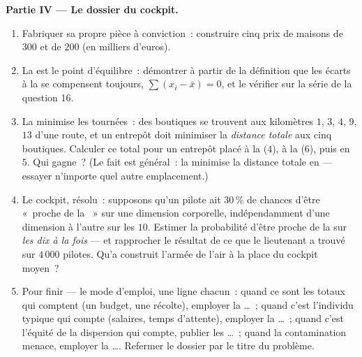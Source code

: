 \begin{problem}
\medskip
\noindent\textbf{Partie IV --- Le dossier du cockpit.}
\begin{enumerate}[resume]
  \item Fabriquer sa propre pièce à conviction~: construire cinq
        prix de maisons de  $300$ et de  $200$ (en
        milliers d'euros).
  \item La  est le point d'équilibre~: démontrer à partir de
        la définition que les écarts à la  se compensent
        toujours, $\sum (x_i - \bar x) = 0$, et le vérifier sur la
        série de la question 16.
  \item La  minimise les tournées~: des boutiques se
        trouvent aux kilomètres $1$, $3$, $4$, $9$, $13$ d'une
        route, et un entrepôt doit minimiser la \emph{distance
        totale} aux cinq boutiques. Calculer ce total pour un
        entrepôt placé à la  ($4$), à la  ($6$), puis
        en $5$. Qui gagne~? (Le fait est général~: la 
        minimise la distance totale en  --- essayer
        n'importe quel autre emplacement.)
  \item Le cockpit, résolu~: supposons qu'un pilote ait $30\,\%$ de
        chances d'être «~proche de la ~» sur une dimension
        corporelle, indépendamment d'une dimension à l'autre sur
        les $10$. Estimer la probabilité d'être proche de la
         sur \emph{les dix à la fois} --- et rapprocher le
        résultat de ce que le lieutenant a trouvé sur $4\,000$
        pilotes. Qu'a construit l'armée de l'air à la place du
        cockpit moyen~?
  \item Pour finir --- le mode d'emploi, une ligne chacun~: quand
        ce sont les totaux qui comptent (un budget, une récolte),
        employer la \dots~; quand c'est l'individu typique qui
        compte (salaires, temps d'attente), employer la \dots~;
        quand c'est l'équité de la dispersion qui compte, publier
        les \dots~; quand la contamination menace, employer la
        \dots. Refermer le dossier par le titre du problème.
\end{enumerate}
\end{problem}
